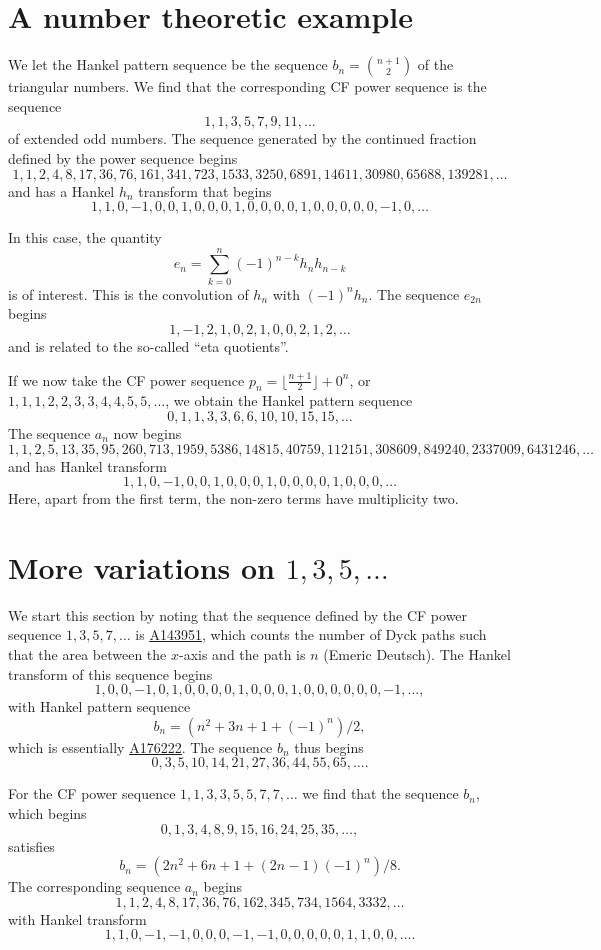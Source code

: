 \documentclass[12pt,reqno]{article}
\theoremstyle{definition}
\newcommand{\seqnum}[1]{\href{http://oeis.org/#1}{\underline{#1}}}
\begin{document}
\section{A number theoretic example}
We let the Hankel  pattern sequence be the sequence $b_n=\binom{n+1}{2}$ of the triangular numbers. We find that the corresponding CF power sequence is the sequence $$1,1,3,5,7,9,11,\ldots$$ of extended odd numbers. The sequence generated by the continued fraction defined by the power sequence begins
$$ 1, 1, 2, 4, 8, 17, 36, 76, 161, 341, 723, 1533, 3250, 6891, 14611, 30980, 65688, 139281, \ldots $$ and has a Hankel $h_n$ transform
that begins
$$ 1, 1, 0, -1, 0, 0, 1, 0, 0, 0, 1, 0, 0, 0, 0, 1, 0, 0, 0, 0, 0, -1, 0, \ldots $$

In this case, the quantity
$$e_n=\sum_{k=0}^n (-1)^{n-k} h_n h_{n-k}$$ is of interest. This is the convolution of $h_n$ with $(-1)^n h_n$. The sequence
$e_{2n}$ begins $$1, -1, 2, 1, 0, 2, 1, 0, 0, 2, 1, 2, \ldots $$ and is related to the so-called ``eta quotients''.

If we now take the CF power sequence $p_n = \lfloor \frac{n+1}{2} \rfloor +0^n$, or $1,1,1,2,2,3,3,4,4,5,5,\ldots$, we obtain
the Hankel pattern sequence $$0, 1, 1, 3, 3, 6, 6, 10, 10, 15, 15, \ldots $$
The sequence $a_n$ now begins
$$1, 1, 2, 5, 13, 35, 95, 260, 713, 1959, 5386, 14815, 40759, 112151, 308609, 849240, 2337009, 6431246, \ldots $$ and has Hankel transform $$1, 1, 0, -1, 0, 0, 1, 0, 0, 0, 1, 0, 0, 0, 0, 1, 0, 0, 0,\ldots$$
\noindent Here, apart from the first term, the non-zero terms have multiplicity two.

\section{More variations on $1,3,5,\ldots$}
We start this section by noting that the sequence defined by the CF power sequence $1,3,5,7,\ldots$ is \seqnum{A143951}, which counts the  number of Dyck paths such that the area between the $x$-axis and the path is $n$ (Emeric Deutsch). The Hankel transform of this sequence begins 
$$1, 0, 0, -1, 0, 1, 0, 0, 0, 0, 1, 0, 0, 0, 1, 0, 0, 0, 0, 0, 0, -1,\ldots,$$ with Hankel pattern sequence 
$$b_n=(n^2+3n+1+(-1)^n)/2,$$ which is essentially \seqnum{A176222}. The sequence $b_n$ thus begins 
$$0, 3, 5, 10, 14, 21, 27, 36, 44, 55, 65,\ldots.$$


For the CF power sequence $1,1,3,3,5,5,7,7,\ldots$ we find that the sequence $b_n$, which begins 
$$0, 1, 3, 4, 8, 9, 15, 16, 24, 25, 35,\ldots,$$ satisfies
$$b_n=(2n^2+6n+1+(2n-1)(-1)^n)/8.$$ 
The corresponding sequence $a_n$ begins 
$$1, 1, 2, 4, 8, 17, 36, 76, 162, 345, 734, 1564, 3332, \ldots$$ with Hankel transform 
$$ 1, 1, 0, -1, -1, 0, 0, 0, -1, -1, 0, 0, 0, 0, 0, 1, 1, 0, 0, \ldots.$$ 
\end{document}
